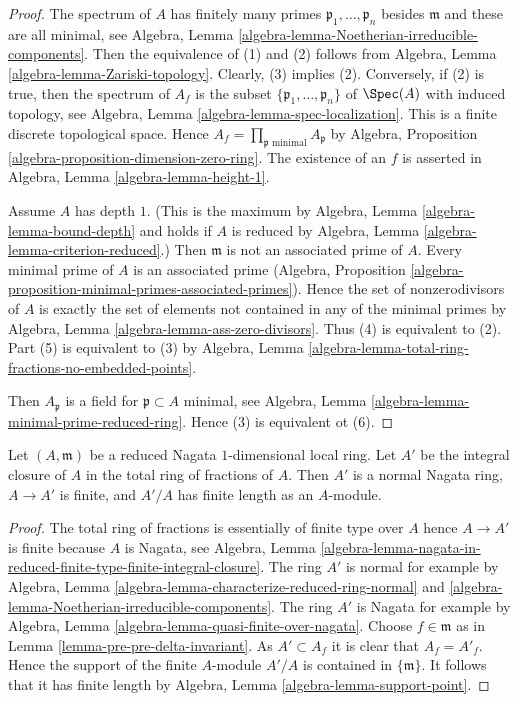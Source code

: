 \begin{proof}
The spectrum of $A$ has finitely many primes
$\mathfrak p_1, \ldots, \mathfrak p_n$ besides $\mathfrak m$
and these are all minimal, see
Algebra, Lemma \ref{algebra-lemma-Noetherian-irreducible-components}.
Then the equivalence of (1) and (2) follows from
Algebra, Lemma \ref{algebra-lemma-Zariski-topology}.
Clearly, (3) implies (2). Conversely, if (2) is true,
then the spectrum of $A_f$ is the subset
$\{\mathfrak p_1, \ldots, \mathfrak p_n\}$ of $\Spec(A)$
with induced topology, see
Algebra, Lemma \ref{algebra-lemma-spec-localization}.
This is a finite discrete topological space.
Hence $A_f = \prod_{\mathfrak p\text{ minimal}} A_\mathfrak p$ by
Algebra, Proposition \ref{algebra-proposition-dimension-zero-ring}.
The existence of an $f$ is asserted in
Algebra, Lemma \ref{algebra-lemma-height-1}.

\medskip\noindent
Assume $A$ has depth $1$. (This is the maximum by
Algebra, Lemma \ref{algebra-lemma-bound-depth} and holds if $A$ is reduced by
Algebra, Lemma \ref{algebra-lemma-criterion-reduced}.)
Then $\mathfrak m$ is not an associated prime of $A$.
Every minimal prime of $A$ is an associated prime
(Algebra, Proposition
\ref{algebra-proposition-minimal-primes-associated-primes}).
Hence the set of nonzerodivisors of $A$ is exactly the set of elements
not contained in any of the minimal primes by
Algebra, Lemma \ref{algebra-lemma-ass-zero-divisors}.
Thus (4) is equivalent to (2).
Part (5) is equivalent to (3) by
Algebra, Lemma \ref{algebra-lemma-total-ring-fractions-no-embedded-points}.

\medskip\noindent
Then $A_\mathfrak p$ is a field for
$\mathfrak p \subset A$ minimal, see
Algebra, Lemma \ref{algebra-lemma-minimal-prime-reduced-ring}.
Hence (3) is equivalent ot (6).
\end{proof}

\begin{lemma}
\label{lemma-pre-delta-invariant}
Let $(A, \mathfrak m)$ be a reduced Nagata $1$-dimensional local ring.
Let $A'$ be the integral closure of $A$ in the total ring of fractions
of $A$. Then $A'$ is a normal Nagata ring, $A \to A'$ is finite, and
$A'/A$ has finite length as an $A$-module.
\end{lemma}

\begin{proof}
The total ring of fractions is essentially of finite type over $A$
hence $A \to A'$ is finite because $A$ is Nagata, see Algebra, Lemma
\ref{algebra-lemma-nagata-in-reduced-finite-type-finite-integral-closure}.
The ring $A'$ is normal for example by
Algebra, Lemma \ref{algebra-lemma-characterize-reduced-ring-normal} and
\ref{algebra-lemma-Noetherian-irreducible-components}.
The ring $A'$ is Nagata for example by
Algebra, Lemma \ref{algebra-lemma-quasi-finite-over-nagata}.
Choose $f \in \mathfrak m$ as in Lemma \ref{lemma-pre-pre-delta-invariant}.
As $A' \subset A_f$ it is clear that $A_f = A'_f$. Hence the support of the
finite $A$-module $A'/A$ is contained in $\{\mathfrak m\}$.
It follows that it has finite length by
Algebra, Lemma \ref{algebra-lemma-support-point}.
\end{proof}

